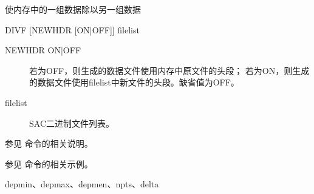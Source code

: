 \label{cmd:divf}

使内存中的一组数据除以另一组数据

\begin{SACSTX}
DIVF [NEWHDR [ON|OFF]] filelist
\end{SACSTX}

\begin{description}
\item [NEWHDR ON|OFF] 若为OFF，则生成的数据文件使用内存中原文件的头段；
    若为ON，则生成的数据文件使用filelist中新文件的头段。缺省值为OFF。
\item [filelist] SAC二进制文件列表。
\end{description}

参见  命令的相关说明。

参见  命令的相关示例。

depmin、depmax、depmen、npts、delta
